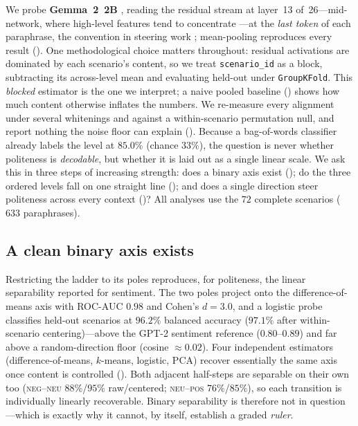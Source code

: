 \documentclass{article}
\begin{document}
We probe \textbf{Gemma~2~2B} \citep{gemmateam2024}, reading the residual stream
at layer~13 of~26---mid-network, where high-level features tend to concentrate
\citep{tigges2023linear}---at the \emph{last token} of each paraphrase, the
convention in steering work \citep{zou2023representation,tigges2023linear};
mean-pooling reproduces every result (). One methodological
choice matters throughout: residual activations are dominated by each scenario's
content, so we treat \texttt{scenario\_id} as a block, subtracting its
across-level mean and evaluating held-out under \texttt{GroupKFold}. This
\emph{blocked} estimator is the one we interpret; a naive pooled baseline
() shows how much content otherwise inflates the numbers. We
re-measure every alignment under several whitenings and against a within-scenario
permutation null, and report nothing the noise floor can explain
(). Because a bag-of-words classifier already labels the
level at $85.0\%$ (chance $33\%$), the question is never whether politeness is
\emph{decodable}, but whether it is laid out as a single linear scale. We ask
this in three steps of increasing strength: does a binary axis exist
(); do the three ordered levels fall on one straight
line (); and does a single direction steer politeness
across every context ()? All analyses use the $72$ complete
scenarios ($633$ paraphrases).

\subsection{A clean binary axis exists}\label{subsec:replication}

Restricting the ladder to its poles reproduces, for politeness, the linear
separability \citet{tigges2023linear} reported for sentiment. The two poles
project onto the difference-of-means axis with ROC-AUC $0.98$ and Cohen's
$d=3.0$, and a logistic probe classifies held-out scenarios at $96.2\%$ balanced
accuracy ($97.1\%$ after within-scenario centering)---above the GPT-2 sentiment
reference ($0.80$--$0.89$) and far above a random-direction floor (cosine
$\approx0.02$). Four independent estimators (difference-of-means, $k$-means,
logistic, PCA) recover essentially the same axis once content is controlled
(). Both adjacent half-steps are separable on their own too
(\textsc{neg}--\textsc{neu} $88\%$/$95\%$ raw/centered;
\textsc{neu}--\textsc{pos} $76\%$/$85\%$), so each transition is individually
linearly recoverable. Binary separability is therefore not in question---which is
exactly why it cannot, by itself, establish a graded \emph{ruler}.
\end{document}
